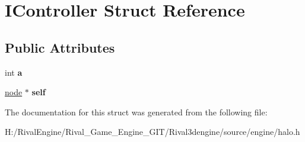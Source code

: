 \hypertarget{struct_i_controller}{}\section{I\+Controller Struct Reference}
\label{struct_i_controller}
\subsection*{Public Attributes}
\begin{DoxyCompactItemize}
\item 
\mbox{\label{struct_i_controller_a62f909fdab19d025eaf3967997b3fd6a}} 
int {\bfseries a}
\item 
\mbox{\label{struct_i_controller_ad17ab0aaef1830552b6d9d4e8352a4ed}} 
\hyperlink{structnode}{node} $\ast$ {\bfseries self}
\end{DoxyCompactItemize}


The documentation for this struct was generated from the following file\+:\begin{DoxyCompactItemize}
\item 
H\+:/\+Rival\+Engine/\+Rival\+\_\+\+Game\+\_\+\+Engine\+\_\+\+G\+I\+T/\+Rival3dengine/source/engine/halo.\+h\end{DoxyCompactItemize}
